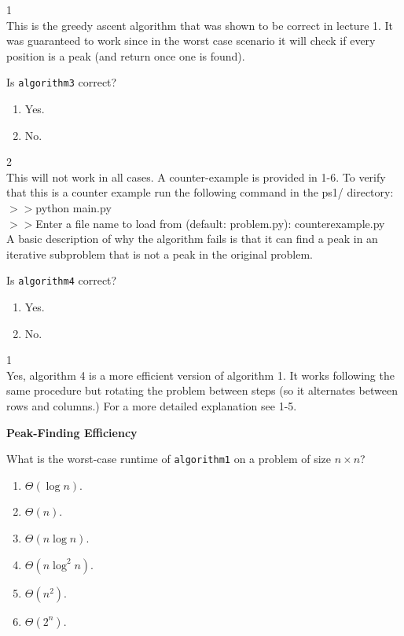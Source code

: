 \documentclass[12pt,twoside]{article}
\begin{document}
\begin{problems}
\begin{problemparts}
\ifsolution \solution{}
1
\\This is the greedy ascent algorithm that was shown to be correct in lecture 1.  It was guaranteed to work since in the worst case scenario it will check if every position is a peak (and return once one is found).
\fi

\problempart {} Is \texttt{algorithm3} correct?
\begin{enumerate}
\item Yes.
\item No.
\end{enumerate}

\ifsolution \solution{}
2
\\This will not work in all cases.  A counter-example is provided in 1-6.  To verify that this is a counter example run the following command in the ps1/ directory:
\\$>>$python main.py
\\$>>$Enter a file name to load from (default: problem.py): counterexample.py
\\A basic description of why the algorithm fails is that it can find a peak in an iterative subproblem that is not a peak in the original problem.
\fi

\problempart {} Is \texttt{algorithm4} correct?
\begin{enumerate}
\item Yes.
\item No.
\end{enumerate}

\ifsolution \solution{}
1
\\Yes, algorithm 4 is a more efficient version of algorithm 1.  It works following the same procedure but rotating the problem between steps (so it alternates between rows and columns.)
For a more detailed explanation see 1-5.
\fi

\end{problemparts}

\problem {} \textbf{Peak-Finding Efficiency}

\begin{problemparts}

\problempart {} What is the worst-case runtime of \texttt{algorithm1} on a problem of size $n \times n$?
\begin{enumerate}
\item $\Theta(\log n)$.
\item $\Theta(n)$.
\item $\Theta(n \log n)$.
\item $\Theta(n \log^2 n)$.
\item $\Theta(n^2)$.
\item $\Theta(2^n)$.
\end{enumerate}


\end{problemparts}
\end{problems}
\end{document}
